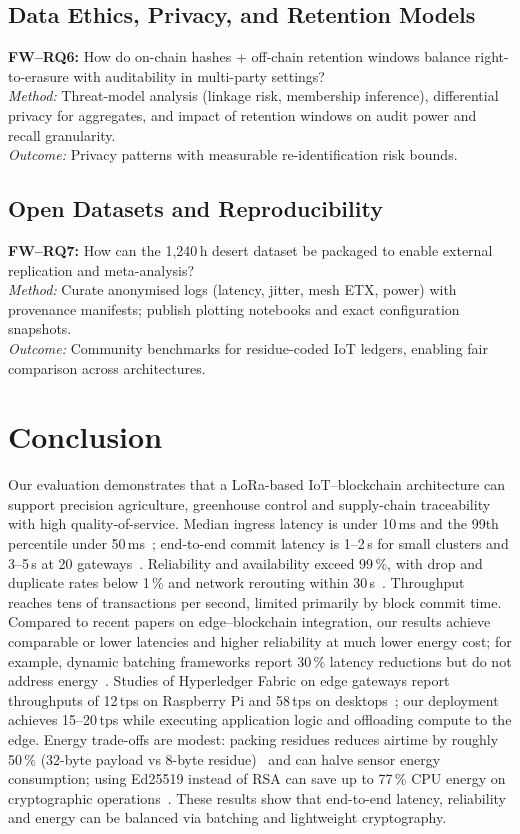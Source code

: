 \documentclass[12pt,onecolumn]{IEEEtran} %
\begin{document}
\subsection{Data Ethics, Privacy, and Retention Models}
\textbf{FW–RQ6:} How do on-chain hashes + off-chain retention windows balance right-to-erasure with auditability in multi-party settings? \\
\textit{Method:} Threat-model analysis (linkage risk, membership inference), differential privacy for aggregates, and impact of retention windows on audit power and recall granularity. \\
\textit{Outcome:} Privacy patterns with measurable re-identification risk bounds.

\subsection{Open Datasets and Reproducibility}
\textbf{FW–RQ7:} How can the 1{,}240\,h desert dataset be packaged to enable external replication and meta-analysis? \\
\textit{Method:} Curate anonymised logs (latency, jitter, mesh ETX, power) with provenance manifests; publish plotting notebooks and exact configuration snapshots. \\
\textit{Outcome:} Community benchmarks for residue-coded IoT ledgers, enabling fair comparison across architectures.

\section{Conclusion}
\label{sec:conclusion}

Our evaluation demonstrates that a LoRa-based IoT–blockchain architecture can support precision agriculture, greenhouse control and supply-chain traceability with high quality-of-service. Median ingress latency is under 10\,ms and the 99th percentile under 50\,ms~\cite{ref76853680998234}; end-to-end commit latency is 1–2\,s for small clusters and 3–5\,s at 20 gateways~\cite{ref76853680998234}. Reliability and availability exceed 99\,\%, with drop and duplicate rates below 1\,\% and network rerouting within 30\,s~\cite{ref76853680998234}. Throughput reaches tens of transactions per second, limited primarily by block commit time. Compared to recent papers on edge–blockchain integration, our results achieve comparable or lower latencies and higher reliability at much lower energy cost; for example, dynamic batching frameworks report 30\,\% latency reductions but do not address energy~\cite{batchit_2024}. Studies of Hyperledger Fabric on edge gateways report throughputs of 12\,tps on Raspberry Pi and 58\,tps on desktops~\cite{melo2025comprehensive}; our deployment achieves 15–20\,tps while executing application logic and offloading compute to the edge. Energy trade-offs are modest: packing residues reduces airtime by roughly 50\,\% (32-byte payload vs 8-byte residue)~\cite{ref76853680998234} and can halve sensor energy consumption; using Ed25519 instead of RSA can save up to 77\,\% CPU energy on cryptographic operations~\cite{klaassen_2025}. These results show that end-to-end latency, reliability and energy can be balanced via batching and lightweight cryptography.
\end{document}
